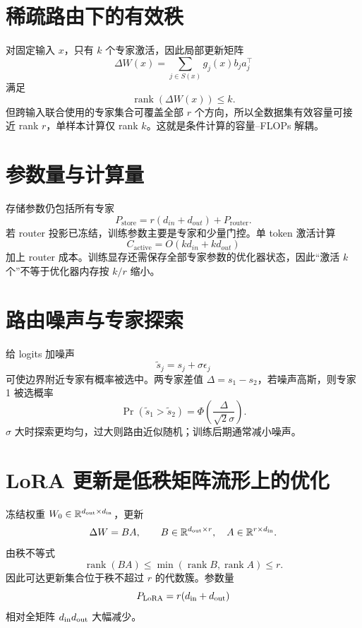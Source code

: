 \documentclass[UTF8,12pt,a4paper,fontset=none]{ctexart}
\numberwithin{equation}{section}
\newcommand{\R}{\mathbb{R}}
\newcommand{\rank}{\operatorname{rank}}
\begin{document}
\section{稀疏路由下的有效秩}
对固定输入 $x$，只有 $k$ 个专家激活，因此局部更新矩阵
\begin{equation}
 \Delta W(x)=\sum_{j\in S(x)}g_j(x)b_ja_j^\top
\end{equation}
满足
\begin{equation}
 \rank(\Delta W(x))\le k.
\end{equation}
但跨输入联合使用的专家集合可覆盖全部 $r$ 个方向，所以全数据集有效容量可接近 rank $r$，单样本计算仅 rank $k$。这就是条件计算的容量--FLOPs 解耦。

\section{参数量与计算量}
存储参数仍包括所有专家
\begin{equation}
 P_{\mathrm{store}}=r(d_{in}+d_{out})+P_{\mathrm{router}}.
\end{equation}
若 router 投影已冻结，训练参数主要是专家和少量门控。单 token 激活计算
\begin{equation}
 C_{\mathrm{active}}=O(kd_{in}+kd_{out})
\end{equation}
加上 router 成本。训练显存还需保存全部专家参数的优化器状态，因此“激活 $k$ 个”不等于优化器内存按 $k/r$ 缩小。

\section{路由噪声与专家探索}
给 logits 加噪声
\begin{equation}
 \widetilde s_j=s_j+\sigma\epsilon_j
\end{equation}
可使边界附近专家有概率被选中。两专家差值 $\Delta=s_1-s_2$，若噪声高斯，则专家 1 被选概率
\begin{equation}
 \Pr(\widetilde s_1>\widetilde s_2)
 =\Phi\left(\frac{\Delta}{\sqrt2\sigma}
\right).
\end{equation}
$\sigma$ 大时探索更均匀，过大则路由近似随机；训练后期通常减小噪声。
\clearpage
\section{LoRA 更新是低秩矩阵流形上的优化}
冻结权重 $W_0\in\R^{d_{\rm out}\times d_{\rm in}}$，更新
\begin{equation}
 \Delta W=BA,
 \qquad B\in\R^{d_{\rm out}\times r},
 \quad A\in\R^{r\times d_{\rm in}}.
\end{equation}
由秩不等式
\begin{equation}
 \rank(BA)\le\min(\rank B,\rank A)\le r.
\end{equation}
因此可达更新集合位于秩不超过 $r$ 的代数簇。参数量
\begin{equation}
 P_{\rm LoRA}=r(d_{\rm in}+d_{\rm out})
\end{equation}
相对全矩阵 $d_{\rm in}d_{\rm out}$ 大幅减少。
\end{document}

